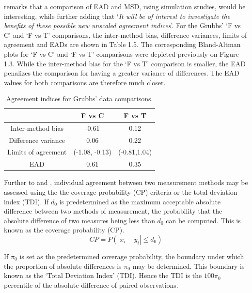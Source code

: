 \documentclass[12pt, a4paper]{report}
\theoremstyle{plain}
\theoremstyle{definition}
\theoremstyle{remark}
\begin{document}
	\citet{Barnhart} remarks that a comparison of EAD and MSD, using
	simulation studies, would be interesting, while further adding
	that `\textit{It will be of interest to investigate the benefits of these
		possible new unscaled agreement indices}'. For the Grubbs' `F vs C' and `F vs T' comparisons, the inter-method bias, difference variances, limits of agreement and EADs are shown
	in Table 1.5. The corresponding Bland-Altman plots for `F vs C' and `F vs T' comparisons were depicted previously on Figure 1.3. While the inter-method bias for the `F vs T' comparison is smaller, the EAD penalizes the comparison for having a greater variance of differences. The EAD values for both comparisons are therefore much closer.
	\begin{table}[ht]
		\begin{center}
			\begin{tabular}{|c||c|c|}
				\hline
				& F vs C & F vs T  \\\hline
				\hline
				Inter-method bias & -0.61 & 0.12 \\ \hline
				Difference variance & 0.06 & 0.22  \\ \hline 
				Limits of agreement & (-1.08,	-0.13) & (-0.81,1.04) \\ \hline
				EAD & 0.61 & 0.35  \\ \hline 
			\end{tabular}
			\caption{Agreement indices for Grubbs' data comparisons.}
		\end{center}
	\end{table}
	
	Further to  \citet{lin2000} and \citet{lin2002}, individual agreement between two measurement methods may be
	assessed using the the coverage probability (CP) criteria or the total deviation index (TDI). If $d_{0}$ is predetermined as the maximum acceptable absolute difference between two methods of measurement, the probability that the absolute difference of two measures being less than $d_{0}$ can be computed. This is known as the coverage probability (CP).
	\begin{equation}
	CP = P(|x_{i} - y_{i}| \leq d_{0})
	\end{equation}
	
	If $\pi_{0}$ is set as the predetermined coverage probability, the
	boundary under which the proportion of absolute differences is
	$\pi_{0}$ may be determined. This boundary is known as the `Total Deviation Index' (TDI). Hence the TDI is the $100\pi_{0}$
	percentile of the absolute difference of paired observations.
	
\end{document}
